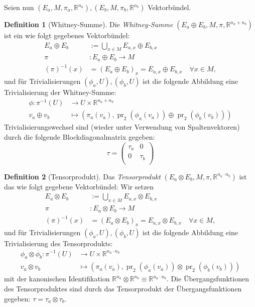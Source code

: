 \documentclass[a4paper]{scrreprt}
\numberwithin{equation}{chapter}
\DeclareMathOperator{\pr}{pr}
\newcommand{\R}{\mathbb{R}}
\theoremstyle{definition}
\newtheorem{defn}{Definition}[section]
\begin{document}
		Seien nun $(E_a,M,\pi_a,\R^{n_a}),(E_b,M,\pi_b,\R^{n_b})$ Vektorbündel.
		\begin{defn}[Whitney-Summe]
			Die \emph{Whitney-Summe} $(E_a\oplus E_b ,M,\pi,\R^{n_a+n_b})$ ist ein wie folgt gegebenes Vektorbündel:
			\begin{align*}
				E_a\oplus E_b&:=\bigcup_{x\in M}E_{a,x}\oplus E_{b,x}\\
				\pi&\colon E_a\oplus E_b\rightarrow M\\
				(\pi)^{-1}(x)&=(E_a\oplus E_b)_x=E_{a,x}\oplus E_{b,x}\quad \forall x\in M,
			\end{align*}
			und für Trivialisierungen $(\phi_a,U),(\phi_b,U)$ ist die folgende Abbildung eine Trivialisierung der Whitney-Summe:
			\begin{align*}
				\phi\colon\pi^{-1}(U)&\rightarrow U\times \R^{n_a+n_b}\\
				v_a\oplus v_b&\mapsto (\pi_a(v_a), \pr_2(\phi_a(v_a))\oplus\pr_2(\phi_b(v_b)))
			\end{align*}
			Trivialisierungswechsel sind (wieder unter Verwendung von Spaltenvektoren) durch die folgende Blockdiagonalmatrix gegeben: 
			\begin{equation}
				\tau=\left(\begin{array}{cc}\tau_a&0\\0&\tau_b\\ \end{array}\right)
			\end{equation}
		\end{defn}
		\begin{defn}[Tensorprodukt]
			Das \emph{Tensorprodukt} $(E_a\otimes E_b, M, \pi, \R^{n_a\cdot n_b})$ ist das wie folgt gegebene Vektorbündel: Wir setzen
			\begin{align*}
				E_a\otimes E_b&:=\bigcup_{x\in M}E_{a,x}\otimes E_{b,x}\\
				\pi&\colon E_a\otimes E_b\rightarrow M\\
				(\pi)^{-1}(x)&=(E_a\otimes E_b)_x=E_{a,x}\otimes E_{b,x}\quad \forall x\in M,
			\end{align*}
			und für Trivialisierungen $(\phi_a,U),(\phi_b,U)$ ist die folgende Abbildung eine Trivialisierung des Tensorprodukts:
			\begin{align*}
				\phi_a\otimes\phi_b\colon\pi^{-1}(U)&\rightarrow U\times \R^{n_a\cdot n_b}\\
				v_a\otimes v_b&\mapsto (\pi_a(v_a), \pr_2(\phi_a(v_a))\otimes\pr_2(\phi_b(v_b)))
			\end{align*}
			mit der kanonischen Identifikation  $\R^{n_a} \otimes\R^{n_b} \equiv \R^{n_a \cdot n_b}$.
			Die Übergangsfunktionen des Tensorproduktes sind durch das Tensorprodukt der Übergangsfunktionen gegeben: $\tau=\tau_a\otimes\tau_b$.
		\end{defn}
		
\end{document}
